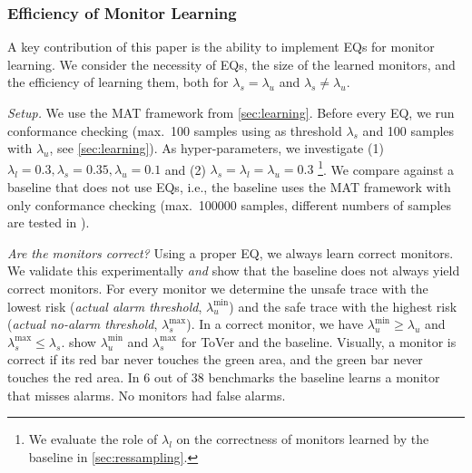 \documentclass[runningheads]{llncs}
\newcommand{\sj}[2][]{\todo[color=red!50!white,#1]{\footnotesize{SJ: #2}}}
\renewcommand{\paragraph}[1]{\smallskip\noindent\emph{#1}}
\newcommand{\alg}{ToVer\xspace}
\begin{document}
\subsubsection{Efficiency of Monitor Learning}
A key contribution of this paper is the ability to implement EQs for monitor learning.
We consider the necessity of EQs, the size of the learned monitors, and the efficiency of learning them, both for $\lambda_s = \lambda_u$ and $\lambda_s \neq \lambda_u$.

\paragraph{Setup.}
We use the MAT framework from \cref{sec:learning}.
Before every EQ, we run conformance checking (max.\ 100 samples using as threshold $\lambda_s$ and 100 samples with $\lambda_u$, see \cref{sec:learning}).
As hyper-parameters, we investigate (1) $\lambda_l = 0.3, \lambda_s = 0.35, \lambda_u = 0.1$ and (2) $\lambda_s = \lambda_l = \lambda_u = 0.3$
\footnote{We evaluate the role of $\lambda_l$ on the correctness of monitors learned by the baseline   in \cref{sec:ressampling}.}.
We compare against a baseline that does not use EQs, i.e., the baseline uses the MAT framework with only conformance checking (max.\ 100000 samples,  different numbers of samples are tested in ).

\paragraph{Are the monitors correct?}
Using a proper EQ, we always learn correct monitors. We validate this experimentally \emph{and} show that the baseline does not always yield correct monitors. For every monitor we determine the unsafe trace with the lowest risk (\emph{actual alarm threshold}, $\lambda_u^{\min}$) and the safe trace with the highest risk (\emph{actual no-alarm threshold}, $\lambda_s^{\max}$). In a correct monitor, we have $\lambda_u^{\min} \geq \lambda_u$ and $\lambda_s^{\max} \leq \lambda_s$.
 show $\lambda_u^{\min}$ and $\lambda_s^{\max}$ for \alg and the baseline. Visually, a monitor is correct if its red bar never touches the green area, and the green bar never touches the red area. In 6 out of 38 benchmarks the baseline learns a monitor that misses alarms. No monitors had false alarms.
\end{document}
